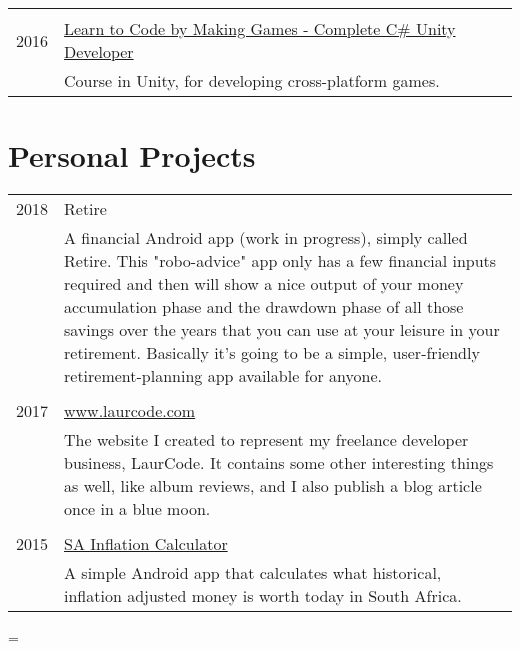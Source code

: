 \documentclass[a4paper,10pt,notitlepage]{article}
\newenvironment{absolutelynopagebreak}
  {\par\nobreak\vfil\penalty0\vfilneg
   \vtop\bgroup}
  {\par\xdef\tpd{\the\prevdepth}\egroup
   \prevdepth=\tpd}
\begin{document}
\begin{absolutelynopagebreak}
\begin{tabular}{r|p{11cm}}
		\multicolumn{2}{c}{} \\
		\textsc{2016} & \href{https://www.udemy.com/unitycourse/learn/v4/}{Learn to Code by Making Games - Complete C\# Unity Developer} \\&\footnotesize{Course in Unity, for developing cross-platform games.} \\
		
	\end{tabular}
	
	\section{Personal Projects}
	\begin{tabular}{r|p{11cm}}
	
	    \textsc{2018} &                                                                                                                  
		Retire\\&\footnotesize{A financial Android app (work in progress), simply called Retire. This "robo-advice" app only has a few financial inputs required and then will show a nice output of your money accumulation phase and the drawdown phase of all those savings over the years that you can use at your leisure in your retirement. Basically it's going to be a simple, user-friendly retirement-planning app available for anyone.} \\
		
		\multicolumn{2}{c}{} \\
		
		\textsc{2017} &                                                                                                                  
		\href{www.laurcode.com}{www.laurcode.com}\\&\footnotesize{The website I created to represent my freelance developer business, LaurCode. It contains some other interesting things as well, like album reviews, and I also publish a blog article once in a blue moon.} \\
		
		\multicolumn{2}{c}{} \\
		\textsc{2015} &                                                                                                                  
		\href{https://play.google.com/store/apps/details?id=za.co.inflationcalc}{SA Inflation Calculator}\\&\footnotesize{A simple Android app that calculates what historical, inflation adjusted money is worth today in South Africa.} \\
		

\end{tabular}
\end{absolutelynopagebreak}
\end{document}
